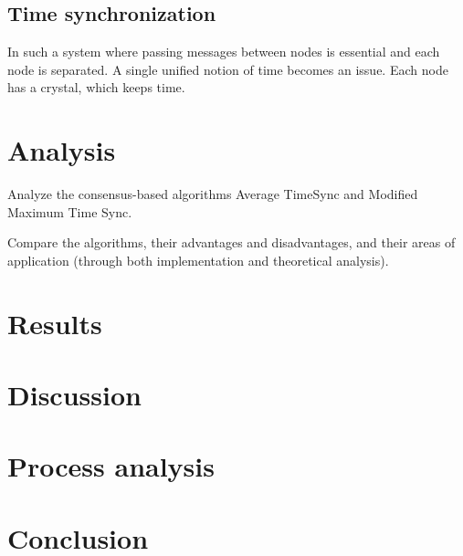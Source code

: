 \documentclass[a4paper,12pt]{article}
\begin{document}
\subsection{Time synchronization}



In such a system where passing messages between nodes is essential and each node is separated. A single unified notion of time becomes an issue. Each node has a crystal, which keeps time. 

 

    

\section{Analysis}%

Analyze the consensus-based algorithms Average TimeSync and Modified Maximum Time Sync. 

Compare the algorithms, their advantages and disadvantages, and their areas of application (through both implementation and theoretical analysis).

\section{Results}


\section{Discussion}

\section{Process analysis}%

\section{Conclusion}



\nocite{*} %
\printbibliography
\end{document}
